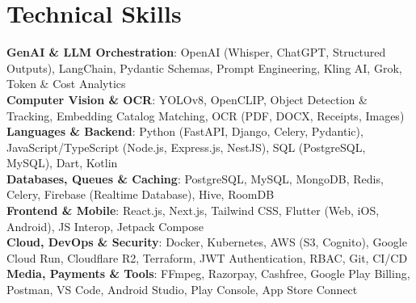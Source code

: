 \documentclass[letterpaper,10pt]{article}
\begin{document}
\section{Technical Skills}
 \begin{itemize}[leftmargin=0.0in, itemsep=3pt, parsep=0pt, topsep=3pt, label={}]
    \small{\item{
     \textbf{GenAI \& LLM Orchestration}{: OpenAI (Whisper, ChatGPT, Structured Outputs), LangChain, Pydantic Schemas, Prompt Engineering, Kling AI, Grok, Token \& Cost Analytics} \\
     \textbf{Computer Vision \& OCR}{: YOLOv8, OpenCLIP, Object Detection \& Tracking, Embedding Catalog Matching, OCR (PDF, DOCX, Receipts, Images)} \\
     \textbf{Languages \& Backend}{: Python (FastAPI, Django, Celery, Pydantic), JavaScript/TypeScript (Node.js, Express.js, NestJS), SQL (PostgreSQL, MySQL), Dart, Kotlin} \\
     \textbf{Databases, Queues \& Caching}{: PostgreSQL, MySQL, MongoDB, Redis, Celery, Firebase (Realtime Database), Hive, RoomDB} \\
     \textbf{Frontend \& Mobile}{: React.js, Next.js, Tailwind CSS, Flutter (Web, iOS, Android), JS Interop, Jetpack Compose} \\
     \textbf{Cloud, DevOps \& Security}{: Docker, Kubernetes, AWS (S3, Cognito), Google Cloud Run, Cloudflare R2, Terraform, JWT Authentication, RBAC, Git, CI/CD} \\
     \textbf{Media, Payments \& Tools}{: FFmpeg, Razorpay, Cashfree, Google Play Billing, Postman, VS Code, Android Studio, Play Console, App Store Connect}
    }}
 \end{itemize}
 \vspace{2pt}

\end{document}
